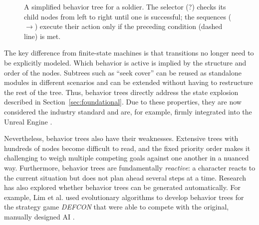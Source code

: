 \begin{figure}[!t]
\centering
{}
\caption{A simplified behavior tree for a soldier. The selector (?) checks its child nodes from left to right until one is successful; the sequences ($\rightarrow$) execute their action only if the preceding condition (dashed line) is met.}
\label{fig:bt}
\end{figure}

The key difference from finite-state machines is that transitions no longer need to be explicitly modeled. Which behavior is active is implied by the structure and order of the nodes. Subtrees such as \glqq “seek cover”\grqq{} can be reused as standalone modules in different scenarios and can be extended without having to restructure the rest of the tree. Thus, behavior trees directly address the state explosion described in Section~\ref{sec:foundational}. Due to these properties, they are now considered the industry standard and are, for example, firmly integrated into the Unreal Engine \cite{colledanchise2018}. 

Nevertheless, behavior trees also have their weaknesses. Extensive trees with hundreds of nodes become difficult to read, and the fixed priority order makes it challenging to weigh multiple competing goals against one another in a nuanced way. Furthermore, behavior trees are fundamentally \emph{reactive}: a character reacts to the current situation but does not plan ahead several steps at a time. Research has also explored whether behavior trees can be generated automatically. For example, Lim et al. used evolutionary algorithms to develop behavior trees for the strategy game \emph{DEFCON} that were able to compete with the original, manually designed AI \cite{lim2010}.

